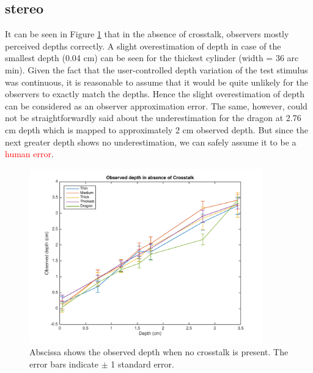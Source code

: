 \subsection{stereo}
It can be seen in Figure \ref{fig:s_crosstalk_0} that in the absence of crosstalk, observers mostly perceived depths correctly. A slight overestimation of depth in case of the smallest depth (0.04 cm) can be seen for the thickest cylinder (width = 36 arc min). Given the fact that the user-controlled depth variation of the test stimulus was continuous, it is reasonable to assume that it would be quite unlikely for the observers to exactly match the depths. Hence the slight overestimation of depth can be considered as an observer approximation error. The same, however, could not be straightforwardly said about the underestimation for the dragon at 2.76 cm depth which is mapped to approximately 2 cm observed depth. But since the next greater depth shows no underestimation, we can safely assume it to be a \textcolor{red}{human error}.
\begin{figure}[H]
\centering
    \includegraphics[width=0.9\textwidth]{./Template_Figures/s_crosstalk_0}
    \caption{Abscissa shows the observed depth when no crosstalk is present. The error bars indicate $\pm$ 1 standard error.\label{fig:s_crosstalk_0}}
\end{figure}

